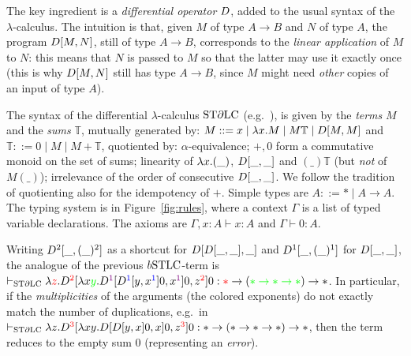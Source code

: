 The key ingredient is a \emph{differential operator} $\Der$,  added to the usual syntax of the $\lambda$-calculus. The intuition is that, given $M$ of type $A\to B$ and $N$ of type $A$, the program $\Diff{M}{N}$, still of type $A\to B$, corresponds to the \emph{linear application} of $M$ to $N$: this means that $N$ is passed to $M$ so that the latter may use it exactly once (this is why $\Diff{M}{N}$ still has type $A\to B$, since $M$ might need \emph{other} copies of an input of type $A$). 

The syntax of the differential $\lambda$-calculus $\mathrm{ST}\partial\mathrm{LC}$ (e.g.\ \cite[Section 3]{Manzo2010}), is given by the \emph{terms} $M$ and the \emph{sums} $\mathbb T$, mutually generated by: $M::= x\mid \lambda x.M \mid M\mathbb T \mid \Diff{M}{M}$ and $\mathbb T::= 0 \mid M \mid M+\mathbb T$,
quotiented by: $\alpha$-equivalence; $+,0$ form a commutative monoid on the set of sums; %
linearity of $\lambda x.(\_)$, $\Diff{\_}{\_}$ and $(\_)\mathbb T$ (but \emph{not} of $M(\_)$); irrelevance of the order of consecutive $\Diff{\_}{\_}$.
We follow the tradition of quotienting also for the idempotency of $+$.
Simple types are $A::= *\mid A\to A$.
The typing system is in Figure~\ref{fig:rules}, where a context $\Gamma$ is a list of typed variable declarations.
The axioms are $\Gamma, x:A \vdash x: A$ and $\Gamma\vdash 0:A$.

Writing $\Der^2[\_,(\_)^2]$ as a shortcut for $\Der[\Der[\_,\_],\_]$ and $\Der^1[\_,(\_)^1]$ for $\Diff{\_}{\_}$, the analogue of the previous $\BSTLC$-term is $\vdash_{\STDLC} \lambda {\color{red}z}. \Der^{\color{red}2}[
	\lambda x{\color{green}y}.
		\Der^{\color{violet}1} [
				\Der^{\color{blue}1} [y, x^{\color{blue}1}]
        0, x^{\color{violet}1}
	]0
, z^{\color{red}2}]0
: {\color{red}*}\to ({\color{green}* \to * \to *}) \to *$.
In particular, if the \emph{multiplicities} of the arguments (the colored exponents) do not exactly match the number of duplications, e.g.\ in $\vdash_{\STDLC} \lambda z. \Der^{\color{red}3}[
	\lambda xy.
		\Diff{
				\Diff{y}{x}
		0}{x}
	0
, z^{\color{red}3}]0
: *\to (* \to * \to *) \to *$, then the term reduces to the empty sum $0$ (representing an \emph{error}).

